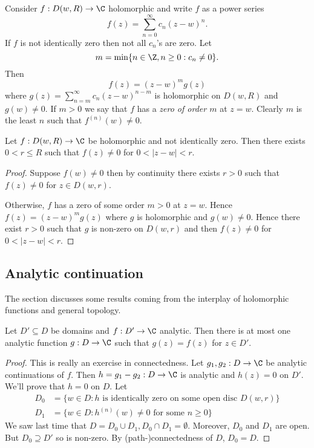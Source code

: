 \documentclass[a4paper]{article}
\begin{document}
Consider \(f: D(w, R) \to \C\) holomorphic and write \(f\) as a power series
\[
  f(z) = \sum_{n = 0}^\infty c_n(z - w)^n.
\]
If \(f\) is not identically zero then not all \(c_n\)'s are zero. Let
\[
  m = \min\{n \in \Z, n \geq 0: c_n \neq 0\}.
\]
Then
\[
  f(z) = (z - w)^m g(z)
\]
where \(g(z) = \sum_{n = m}^\infty c_n(z - w)^{n - m}\) is holomorphic on \(D(w, R)\) and \(g(w) \neq 0\). If \(m > 0\) we say that \(f\) has a \emph{zero of order \(m\)} at \(z = w\). Clearly \(m\) is the least \(n\) such that \(f^{(n)}(w) \neq 0\).

\begin{theorem}
  \label{thm:principle of isolated zeros}
  Let \(f: D(w, R) \to \C\) be holomorphic and not identically zero. Then there exists \(0 < r \leq R\) such that \(f(z) \neq 0\) for \(0 < |z - w| < r\).
\end{theorem}

\begin{proof}
  Suppose \(f(w) \neq 0\) then by continuity there exists \(r > 0\) such that \(f(z) \neq 0\) for \(z \in D(w, r)\).

  Otherwise, \(f\) has a zero of some order \(m > 0\) at \(z = w\). Hence \(f(z) = (z - w)^mg(z)\) where \(g\) is holomorphic and \(g(w) \neq 0\). Hence there exist \(r > 0\) such that \(g\) is non-zero on \(D(w, r)\) and then \(f(z) \neq 0\) for \(0 < |z - w| < r\).
\end{proof}

\subsection{Analytic continuation}

The section discusses some results coming from the interplay of holomorphic functions and general topology.

\begin{theorem}
  Let \(D' \subseteq D\) be domains and \(f: D' \to \C\) analytic. Then there is at most one analytic function \(g: D \to \C\) such that \(g(z) = f(z)\) for \(z \in D'\).
\end{theorem}

\begin{proof}
  This is really an exercise in connectedness. Let \(g_1, g_2: D \to \C\) be analytic continuations of \(f\). Then \(h = g_1 - g_2: D \to \C\) is analytic and \(h(z) = 0\) on \(D'\). We'll prove that \(h = 0\) on \(D\). Let
  \begin{align*}
    D_0 &= \{w \in D: h \text{ is identically zero on some open disc } D(w, r)\} \\
    D_1 &= \{w \in D: h^{(n)}(w) \neq 0 \text{ for some } n \geq 0\}
  \end{align*}
  We saw last time that \(D = D_0 \cup D_1, D_0 \cap D_1 = \emptyset\). Moreover, \(D_0\) and \(D_1\) are open. But \(D_0 \supseteq D'\) so is non-zero. By (path-)connectedness of \(D\), \(D_0 = D\).
\end{proof}
\end{document}
